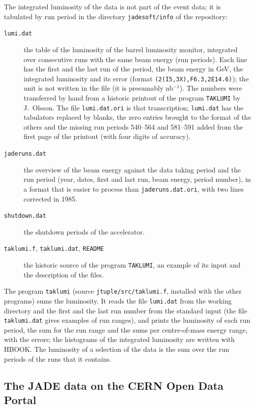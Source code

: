 The integrated luminosity of the data is not part of the event data; it is tabulated by run period in the directory
\texttt{jadesoft/\allowbreak{}info} of the repository:
\begin{description}
\item[\texttt{lumi.dat}] the table of the luminosity of the barrel luminosity monitor, integrated over consecutive runs with
the same beam energy (run periods). Each line has the first and the last run of the period, the beam energy in GeV, the
integrated luminosity and its error (format \texttt{(2(I5,3X),F6.3,2E14.6)}); the unit is not written in the file (it is
presumably nb$^{-1}$). The numbers were transferred by hand from a historic printout of the program
\texttt{TAKLUMI} by J.~Olsson. The file \texttt{lumi.dat.ori} is that transcription; \texttt{lumi.dat} has the tabulators
replaced by blanks, the zero entries brought to the format of the others and the missing run periods 540--564 and
581--591 added from the first page of the printout (with four digits of accuracy).
\item[\texttt{jaderuns.dat}] the overview of the beam energy against the data taking period and the run period (year, dates,
first and last run, beam energy, period number), in a format that is easier to process than \texttt{jaderuns.dat.ori}, with two
lines corrected in 1985.
\item[\texttt{shutdown.dat}] the shutdown periods of the accelerator.
\item[\texttt{taklumi.f}, \texttt{taklumi.dat}, \texttt{README}] the historic source of the program \texttt{TAKLUMI}, an example
of its input and the description of the files.
\end{description}
The program \texttt{taklumi} (source \texttt{jtuple/\allowbreak{}src/\allowbreak{}taklumi.f}, installed with the other programs) sums the luminosity.
It reads the file \texttt{lumi.dat} from the working directory and the first and the last run number from the standard
input (the file \texttt{taklumi.dat} gives examples of run ranges), and prints the luminosity of each run period, the
sum for the run range and the sums per centre-of-mass energy range, with the errors; the histograms of the integrated
luminosity are written with HBOOK. The luminosity of a selection of the data is the sum over the run periods of the runs
that it contains.

\subsection{The JADE data on the CERN Open Data Portal}
\label{sec:opendata}

